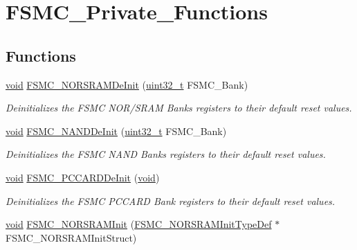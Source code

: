 \hypertarget{group___f_s_m_c___private___functions}{}\section{F\+S\+M\+C\+\_\+\+Private\+\_\+\+Functions}
\label{group___f_s_m_c___private___functions}
\subsection*{Functions}
\begin{DoxyCompactItemize}
\item 
\hyperlink{usb__devapi_8h_afabf60e7f57651d6d595a02c75f07cd0}{void} \hyperlink{group___f_s_m_c___private___functions_gaab3e6648e8a584e73785361ac960eded}{F\+S\+M\+C\+\_\+\+N\+O\+R\+S\+R\+A\+M\+De\+Init} (\hyperlink{_p_e___types_8h_a33594304e786b158f3fb30289278f5af}{uint32\+\_\+t} F\+S\+M\+C\+\_\+\+Bank)
\begin{DoxyCompactList}\small\item\em Deinitializes the F\+S\+MC N\+O\+R/\+S\+R\+AM Banks registers to their default reset values. \end{DoxyCompactList}\item 
\hyperlink{usb__devapi_8h_afabf60e7f57651d6d595a02c75f07cd0}{void} \hyperlink{group___f_s_m_c___private___functions_gafb749503293474a68555961bd8f120e1}{F\+S\+M\+C\+\_\+\+N\+A\+N\+D\+De\+Init} (\hyperlink{_p_e___types_8h_a33594304e786b158f3fb30289278f5af}{uint32\+\_\+t} F\+S\+M\+C\+\_\+\+Bank)
\begin{DoxyCompactList}\small\item\em Deinitializes the F\+S\+MC N\+A\+ND Banks registers to their default reset values. \end{DoxyCompactList}\item 
\hyperlink{usb__devapi_8h_afabf60e7f57651d6d595a02c75f07cd0}{void} \hyperlink{group___f_s_m_c___private___functions_ga2f53ccf3a4f3c80a5a56fb47ccd47ccd}{F\+S\+M\+C\+\_\+\+P\+C\+C\+A\+R\+D\+De\+Init} (\hyperlink{usb__devapi_8h_afabf60e7f57651d6d595a02c75f07cd0}{void})
\begin{DoxyCompactList}\small\item\em Deinitializes the F\+S\+MC P\+C\+C\+A\+RD Bank registers to their default reset values. \end{DoxyCompactList}\item 
\hyperlink{usb__devapi_8h_afabf60e7f57651d6d595a02c75f07cd0}{void} \hyperlink{group___f_s_m_c___private___functions_ga9c27816e8b17394c9ee1ce9298917b4a}{F\+S\+M\+C\+\_\+\+N\+O\+R\+S\+R\+A\+M\+Init} (\hyperlink{struct_f_s_m_c___n_o_r_s_r_a_m_init_type_def}{F\+S\+M\+C\+\_\+\+N\+O\+R\+S\+R\+A\+M\+Init\+Type\+Def} $\ast$F\+S\+M\+C\+\_\+\+N\+O\+R\+S\+R\+A\+M\+Init\+Struct)

\end{DoxyCompactItemize}
